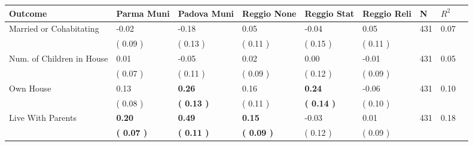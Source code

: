 \begin{tabular}{L{6.2cm} C{1.8cm} C{1.8cm} C{1.8cm} C{1.8cm} C{1.8cm} C{1.8cm} C{0.3cm} C{0.3cm}}
\toprule
 \textbf{Outcome} & \textbf{Parma Muni} & \textbf{Padova Muni} & \textbf{Reggio None} & \textbf{Reggio Stat} & \textbf{Reggio Reli} & \textbf{N} & \textbf{$ R^2$} \\
\midrule
Married or Cohabitating &     -0.02 &     -0.18 &      0.05 &     -0.04 &      0.05  & 431 &       0.07 \\ 
 & (     0.09 ) & (     0.13 ) & (     0.11 ) & (     0.15 ) & (     0.11 )  & \\
Num. of Children in House &      0.01 &     -0.05 &      0.02 &      0.00 &     -0.01  & 431 &       0.05 \\ 
 & (     0.07 ) & (     0.11 ) & (     0.09 ) & (     0.12 ) & (     0.09 )  & \\
Own House &      0.13 & \textbf{     0.26} &      0.16 & \textbf{     0.24} &     -0.06  & 431 &       0.10 \\ 
 & (     0.08 ) & \textbf{(     0.13 )} & (     0.11 ) & \textbf{(     0.14 )} & (     0.10 )  & \\
Live With Parents & \textbf{     0.20} & \textbf{     0.49} & \textbf{     0.15} &     -0.03 &      0.01  & 431 &       0.18 \\ 
 & \textbf{(     0.07 )} & \textbf{(     0.11 )} & \textbf{(     0.09 )} & (     0.12 ) & (     0.09 )  & \\
\bottomrule
\end{tabular}
